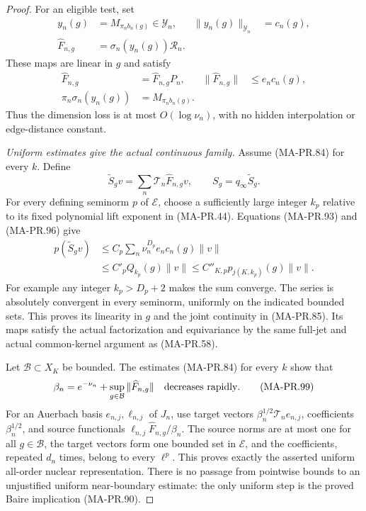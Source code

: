 \begin{proof}
For an eligible test, set
\[
 \begin{aligned}
 y_n(g)&=M_{\pi_nb_n(g)}\in\mathcal Y_n,&
 \|y_n(g)\|_{\mathcal Y_n}&=c_n(g),\\
 \widehat F_{n,g}&=\sigma_n(y_n(g))\mathscr R_n .
 \end{aligned}
 \tag{MA-PR.95}
\]
These maps are linear in \(g\) and satisfy
\[
 \begin{aligned}
 \widehat F_{n,g}&=\widehat F_{n,g}P_n,&
 \|\widehat F_{n,g}\|&\le e_nc_n(g),\\
 \pi_n\sigma_n(y_n(g))&=M_{\pi_nb_n(g)} .
 \end{aligned}
 \tag{MA-PR.96}
\]
Thus the dimension loss is at most \(O(\log\nu_n)\),
with no hidden interpolation or edge-distance constant.

\emph{Uniform estimates give the actual continuous family.}
Assume (MA-PR.84) for every \(k\).
Define
\[
        \widetilde S_gv
              =\sum_n\mathcal T_n\widehat F_{n,g}v,
              \qquad S_g=q_\infty\widetilde S_g .
 \tag{MA-PR.97}
\]
For every defining seminorm \(p\) of \(\mathcal E\),
choose a sufficiently large integer \(k_p\) relative
to its fixed polynomial lift exponent in (MA-PR.44).
Equations (MA-PR.93) and (MA-PR.96) give
\[
 \begin{aligned}
 p(\widetilde S_gv)
   &\le C_p\sum_n\nu_n^{D_p}e_nc_n(g)\|v\|\\
   &\le C'_p Q_{k_p}(g)\|v\|
    \le C''_{K,p}p_{j(K,k_p)}(g)\|v\|.
 \end{aligned}
 \tag{MA-PR.98}
\]
For example any integer \(k_p>D_p+2\) makes the
sum converge.  The series is absolutely convergent
in every seminorm, uniformly on the indicated
bounded sets.  This proves its linearity in \(g\)
and the joint continuity in (MA-PR.85).
Its maps satisfy the actual factorization and
equivariance by the same full-jet and actual
common-kernel argument as (MA-PR.58).

Let \(\mathcal B\subset X_K\) be bounded.
The estimates (MA-PR.84) for every \(k\) show that
\[
       \beta_n=e^{-\nu_n}
                   +\sup_{g\in\mathcal B}\|\widehat F_{n,g}\|
                   \quad\hbox{decreases rapidly}.
 \tag{MA-PR.99}
\]
For an Auerbach basis \(e_{n,j},\ell_{n,j}\) of \(J_n\),
use target vectors
\(\beta_n^{1/2}\mathcal T_ne_{n,j}\),
coefficients \(\beta_n^{1/2}\), and source functionals
\(\ell_{n,j}\widehat F_{n,g}/\beta_n\).
The source norms are at most one for all
\(g\in\mathcal B\), the target vectors form one
bounded set in \(\mathcal E\), and the coefficients,
repeated \(d_n\) times, belong to every \(\ell^p\).
This proves exactly the asserted uniform
all-order nuclear representation.
There is no passage from pointwise bounds to
an unjustified uniform near-boundary estimate:
the only uniform step is the proved Baire implication
(MA-PR.90).


\end{proof}
